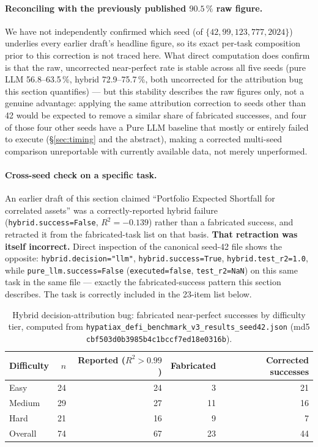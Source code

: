 \documentclass[twoside,11pt]{article}
\newcommand{\Rsq}{R^{2}}
\begin{document}
\paragraph{Reconciling with the previously published $90.5\,\%$ raw
figure.} We have not independently confirmed which seed (of $\{42, 99,
123, 777, 2024\}$) underlies every earlier draft's headline figure, so
its exact per-task composition prior to this correction is not traced
here. What direct computation does confirm is that the raw, uncorrected
near-perfect rate is stable across all five seeds (pure LLM 56.8--63.5\,\%,
hybrid 72.9--75.7\,\%, both uncorrected for the attribution bug this
section quantifies) --- but this stability describes the raw figures
only, not a genuine advantage: applying the same attribution correction
to seeds other than 42 would be expected to remove a similar share of
fabricated successes, and four of those four other seeds have a Pure LLM
baseline that mostly or entirely failed to execute (\S\ref{sec:timing}
and the abstract), making a corrected multi-seed comparison unreportable
with currently available data, not merely unperformed.

\paragraph{Cross-seed check on a specific task.} An earlier draft of this
section claimed ``Portfolio Expected Shortfall for correlated assets''
was a correctly-reported hybrid failure (\texttt{hybrid.success=False},
$\Rsq=-0.139$) rather than a fabricated success, and retracted it from
the fabricated-task list on that basis. \textbf{That retraction was
itself incorrect.} Direct inspection of the canonical seed-42 file shows
the opposite: \texttt{hybrid.decision="llm"}, \texttt{hybrid.success=True},
\texttt{hybrid.test\_r2=1.0}, while \texttt{pure\_llm.success=False}
(\texttt{executed=false}, \texttt{test\_r2=NaN}) on this same task in the
same file --- exactly the fabricated-success pattern this section
describes. The task is correctly included in the 23-item list below.

\begin{table}[h]
\centering
\caption{Hybrid decision-attribution bug: fabricated near-perfect successes by
difficulty tier, computed from \texttt{hypatiax\_defi\_benchmark\_v3\_results\_seed42.json}
(md5 \texttt{cbf503d0b3985b4c1bccf7ed18e0316b}).}
\label{tab:hybrid-bug-breakdown}
\begin{tabular}{lrrrr}
\toprule
Difficulty & $n$ & Reported ($\Rsq>0.99$) & Fabricated & Corrected successes \\
\midrule
Easy    & 24 & 24 & 3  & 21 \\
Medium  & 29 & 27 & 11 & 16 \\
Hard    & 21 & 16 & 9  & 7 \\
\midrule
Overall & 74 & 67 & 23 & 44 \\
\bottomrule
\end{tabular}
\end{table}
\end{document}
